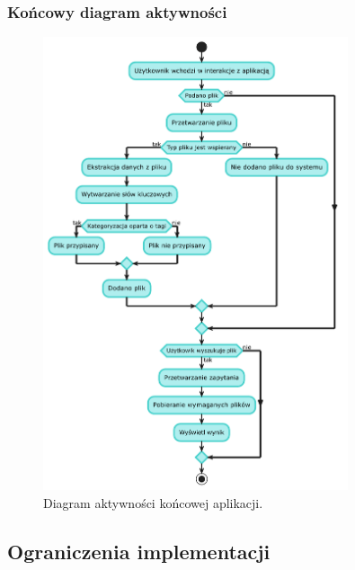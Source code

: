 \documentclass[12pt,a4paper,twoside]{article}
\begin{document}
\subsubsection*{Końcowy diagram aktywności}
\begin{figure}[h!]
\centering
\includegraphics[width=0.8\textwidth]{img/plantuml.pdf}
\caption{Diagram aktywności końcowej aplikacji.}
\end{figure}
\newpage
\clearpage
\subsection{Ograniczenia implementacji}
\end{document}
